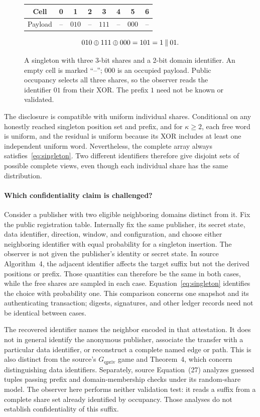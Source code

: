 \begin{figure}[ht]
\centering
\begin{tabular}{c*{7}{c}}
\toprule
Cell & 0 & 1 & 2 & 3 & 4 & 5 & 6\\
\midrule
Payload & -- & $010$ & -- & $111$ & -- & $000$ & --\\
\bottomrule
\end{tabular}
\[
  010\mathbin{\oplus}111\mathbin{\oplus}000=101=1\mathbin\Vert01.
\]
\caption{A singleton with three 3-bit shares and a 2-bit domain identifier.
An empty cell is marked ``--''; $000$ is an occupied payload. Public occupancy
selects all three shares, so the observer reads the identifier $01$ from their
XOR. The prefix $1$ need not be known or validated.}
\label{fig:example}
\end{figure}

The disclosure is compatible with uniform individual shares. Conditional on
any honestly reached singleton position set and prefix, and for $\kappa\geq2$,
each free word is uniform, and the residual is uniform because its XOR includes
at least one independent uniform word. Nevertheless, the complete array
always satisfies~\eqref{eq:singleton}. Two different identifiers therefore
give disjoint sets of possible complete views, even though each individual
share has the same distribution.

\paragraph{Which confidentiality claim is challenged?}
Consider a publisher with two eligible neighboring domains distinct from it.
Fix the public registration table. Internally fix the same publisher, its
secret state, data identifier, direction, window, and configuration, and choose
either neighboring identifier with equal probability for a singleton insertion.
The observer is not given the publisher's identity or secret state. In source
Algorithm~4, the adjacent identifier affects the target suffix but not the
derived positions or prefix. Those quantities can therefore be the same in
both cases, while the free shares are sampled in each case.
Equation~\eqref{eq:singleton} identifies the choice with probability one.
This comparison concerns one snapshot and its authenticating transaction;
digests, signatures, and other ledger records need not be identical between cases.

The recovered identifier names the neighbor encoded in that attestation.
It does not in general identify the anonymous publisher, associate the transfer with a
particular data identifier, or reconstruct a complete named edge or path.
This is also distinct from the source's $G_{\mathrm{qpriv}}$ game and
Theorem~4, which concern distinguishing data identifiers. Separately, source
Equation~(27) analyzes guessed tuples passing prefix and domain-membership
checks under its random-share model. The observer here performs neither
validation test: it reads a suffix from a complete share set already identified
by occupancy. Those analyses do not establish confidentiality of this suffix.

